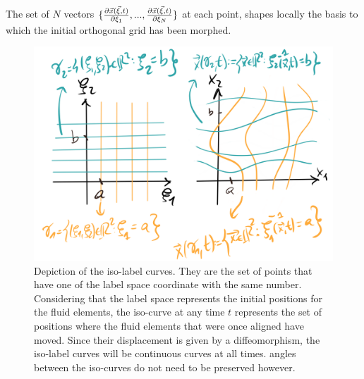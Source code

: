 \documentclass[11pt, a4paper]{article} %
\begin{document}
The set of $N$ vectors $\{\pdv{\vec{x}(\vec{\xi},t)}{\xi_1},...,\pdv{\vec{x}(\vec{\xi},t)}{\xi_N} \}$ at each point, shapes locally the basis to which the initial orthogonal grid has been morphed.

\begin{figure}[h!]
  \centering
    \includegraphics[width=0.65\linewidth]{5isolines.png}
  \caption{Depiction of the iso-label curves. They are the set of points that have one of the label space coordinate with the same number. Considering that the label space represents the initial positions for the fluid elements, the iso-curve at any time $t$ represents the set of positions where the fluid elements that were once aligned have moved. Since their displacement is given by a diffeomorphism, the iso-label curves will be continuous curves at all times. angles between the iso-curves do not need to be preserved however. }
  \label{fig:isoline}
\end{figure}
\end{document}
